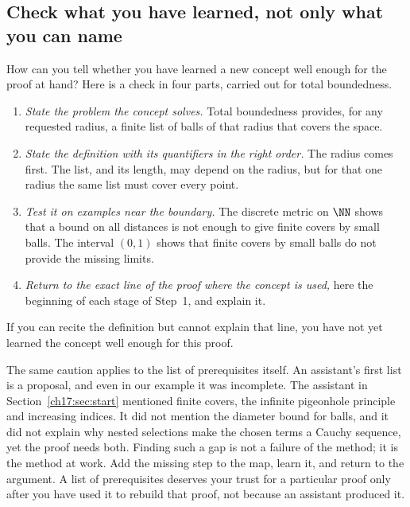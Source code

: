\subsection*{Check what you have learned, not only what you can name}
How can you tell whether you have learned a new concept well enough for the proof at hand? Here is a check in four parts, carried out for total boundedness.
\begin{enumerate}
\item \emph{State the problem the concept solves.} Total boundedness provides, for any requested radius, a finite list of balls of that radius that covers the space.
\item \emph{State the definition with its quantifiers in the right order.} The radius comes first. The list, and its length, may depend on the radius, but for that one radius the same list must cover every point.
\item \emph{Test it on examples near the boundary.} The discrete metric on $\NN$ shows that a bound on all distances is not enough to give finite covers by small balls. The interval $(0,1)$ shows that finite covers by small balls do not provide the missing limits.
\item \emph{Return to the exact line of the proof where the concept is used,} here the beginning of each stage of Step~1, and explain it.
\end{enumerate}
If you can recite the definition but cannot explain that line, you have not yet learned the concept well enough for this proof.

The same caution applies to the list of prerequisites itself. An assistant's first list is a proposal, and even in our example it was incomplete. The assistant in Section~\ref{ch17:sec:start} mentioned finite covers, the infinite pigeonhole principle and increasing indices. It did not mention the diameter bound for balls, and it did not explain why nested selections make the chosen terms a Cauchy sequence, yet the proof needs both. Finding such a gap is not a failure of the method; it is the method at work. Add the missing step to the map, learn it, and return to the argument. A list of prerequisites deserves your trust for a particular proof only after you have used it to rebuild that proof, not because an assistant produced it.
